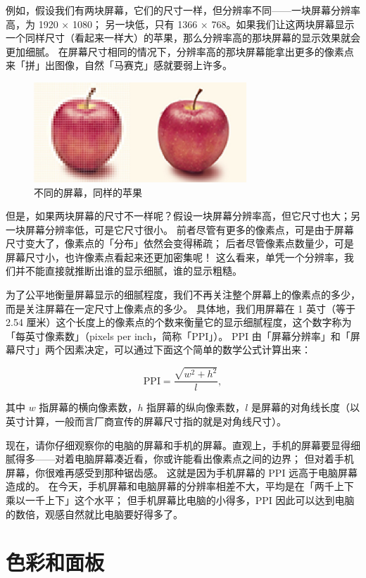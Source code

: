 例如，假设我们有两块屏幕，它们的尺寸一样，但分辨率不同——一块屏幕分辨率高，为 1920 × 1080；
另一块低，只有 1366 × 768。如果我们让这两块屏幕显示一个同样尺寸（看起来一样大）的苹果，那么分辨率高的那块屏幕的显示效果就会更加细腻。
在屏幕尺寸相同的情况下，分辨率高的那块屏幕能拿出更多的像素点来「拼」出图像，自然「马赛克」感就要弱上许多。

\begin{figure}[htb!]
  \centering
  \includegraphics[width=8cm]{assets/Different_Apple.jpg}
  \caption{不同的屏幕，同样的苹果}
  \label{Different_Apple}
\end{figure}

但是，如果两块屏幕的尺寸不一样呢？假设一块屏幕分辨率高，但它尺寸也大；另一块屏幕分辨率低，可是它尺寸很小。
前者尽管有更多的像素点，可是由于屏幕尺寸变大了，像素点的「分布」依然会变得稀疏；
后者尽管像素点数量少，可是屏幕尺寸小，也许像素点看起来还更加密集呢！
这么看来，单凭一个分辨率，我们并不能直接就推断出谁的显示细腻，谁的显示粗糙。

为了公平地衡量屏幕显示的细腻程度，我们不再关注整个屏幕上的像素点的多少，而是关注屏幕在一定尺寸上像素点的多少。
具体地，我们用屏幕在 1 英寸（等于 2.54 厘米）这个长度上的像素点的个数来衡量它的显示细腻程度，这个数字称为「每英寸像素数」（pixels per inch，简称「PPI」）。
PPI 由「屏幕分辨率」和「屏幕尺寸」两个因素决定，可以通过下面这个简单的数学公式计算出来：

\[
  \mathrm{PPI} = \frac{\sqrt{w^2 + h^2}}{l},
\]

其中 $w$ 指屏幕的横向像素数，$h$ 指屏幕的纵向像素数，$l$ 是屏幕的对角线长度（以英寸计算，一般而言厂商宣传的屏幕尺寸指的就是对角线尺寸）。

现在，请你仔细观察你的电脑的屏幕和手机的屏幕。直观上，手机的屏幕要显得细腻得多——对着电脑屏幕凑近看，你或许能看出像素点之间的边界；
但对着手机屏幕，你很难再感受到那种锯齿感。
这就是因为手机屏幕的 PPI 远高于电脑屏幕造成的。
在今天，手机屏幕和电脑屏幕的分辨率相差不大，平均是在「两千上下乘以一千上下」这个水平；
但手机屏幕比电脑的小得多，PPI 因此可以达到电脑的数倍，观感自然就比电脑要好得多了。

\section{色彩和面板}

